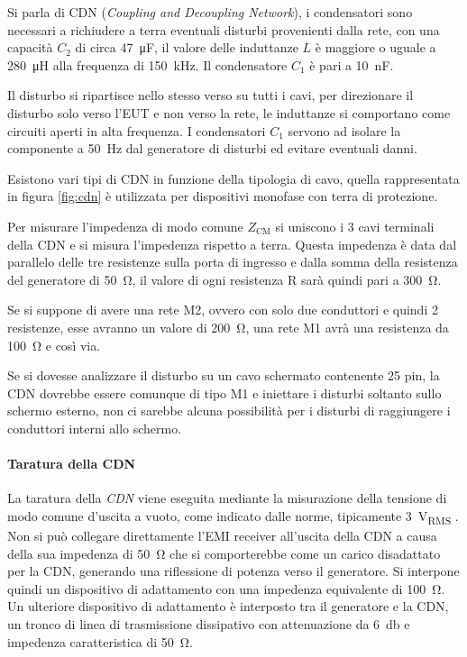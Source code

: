 Si parla di CDN (\textit{Coupling and Decoupling Network}), i condensatori sono necessari a 
richiudere a terra eventuali disturbi provenienti dalla rete, con una
capacità $C_2$ di circa \SI{47}{\micro\farad}, il valore delle induttanze $L$
è maggiore o uguale a \SI{280}{\micro\henry} alla frequenza di \SI{150}{\kilo\hertz}.
Il condensatore $C_1$ è pari a \SI{10}{\nano\farad}.

Il disturbo si ripartisce nello stesso verso su tutti i cavi, per direzionare
il disturbo solo verso l'EUT e non verso la rete, le induttanze si comportano
come circuiti aperti in alta frequenza.
I condensatori $C_1$ servono ad isolare la componente a \SI{50}{\hertz} dal
generatore di disturbi ed evitare eventuali danni.

Esistono vari tipi di CDN in funzione della tipologia di cavo, quella rappresentata
in figura \ref{fig:cdn} è utilizzata per dispositivi monofase con terra di protezione.

Per misurare l'impedenza di modo comune $Z_{\text{CM}}$ si uniscono i 3 cavi terminali 
della CDN e si misura l'impedenza rispetto a terra. Questa impedenza è data dal 
parallelo delle tre resistenze sulla porta di ingresso e dalla somma della
resistenza del generatore di \SI{50}{\ohm}, il valore di ogni resistenza R sarà quindi 
pari a \SI{300}{\ohm}.

Se si suppone di avere una rete M2, ovvero con solo due conduttori e quindi 2 resistenze,
esse avranno un valore di \SI{200}{\ohm}, una rete M1 avrà una resistenza da 
\SI{100}{\ohm} e così via.

Se si dovesse analizzare il disturbo su un cavo schermato contenente 25 pin,
la CDN dovrebbe essere comunque di tipo M1 e iniettare i disturbi soltanto
sullo schermo esterno, non ci sarebbe alcuna possibilità per i disturbi
di raggiungere i conduttori interni allo schermo.
\paragraph{Taratura della CDN}
La taratura della \textit{CDN} viene eseguita mediante la misurazione della
tensione di modo comune d'uscita a vuoto, come indicato dalle norme, tipicamente
\SI{3}{\volt_{RMS}} .
Non si può collegare direttamente l'EMI receiver all'uscita della CDN a causa
della sua impedenza di \SI{50}{\ohm} che si comporterebbe  come un carico
disadattato per la CDN, generando una riflessione di potenza verso il
generatore. Si interpone quindi un dispositivo di adattamento con una impedenza
equivalente di \SI{100}{\ohm}. Un ulteriore dispositivo di adattamento è interposto 
tra il generatore e la CDN, un tronco di linea di trasmissione dissipativo con
attenuazione da \SI{6}{\decibel} e impedenza caratteristica di \SI{50}{\ohm}.

